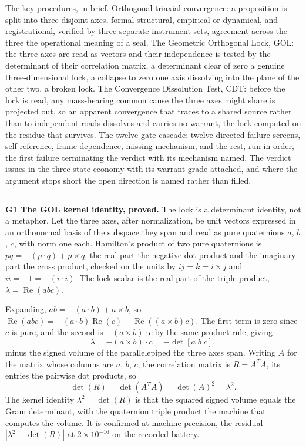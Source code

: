 \documentclass[10pt,twocolumn]{article}
\newenvironment{jbox}{\par\vspace{2pt}\noindent\color{accent}\rule{\columnwidth}{0.8pt}\par\vspace{-2pt}\small}{\par\vspace{2pt}}
\begin{document}
The key procedures, in brief. Orthogonal triaxial convergence: a
proposition is split into three disjoint axes, formal-structural,
empirical or dynamical, and registrational, verified by three separate
instrument sets, agreement across the three the operational meaning of a
seal. The Geometric Orthogonal Lock, GOL: the three axes are read as
vectors and their independence is tested by the determinant of their
correlation matrix, a determinant clear of zero a genuine
three-dimensional lock, a collapse to zero one axis dissolving into the
plane of the other two, a broken lock. The Convergence Dissolution Test,
CDT: before the lock is read, any mass-bearing common cause the three
axes might share is projected out, so an apparent convergence that
traces to a shared source rather than to independent roads dissolves and
carries no warrant, the lock computed on the residue that survives. The
twelve-gate cascade: twelve directed failure screens, self-reference,
frame-dependence, missing mechanism, and the rest, run in order, the
first failure terminating the verdict with its mechanism named. The
verdict issues in the three-state economy with its warrant grade
attached, and where the argument stops short the open direction is named
rather than filled.

\begin{jbox}
\color{black}
\textbf{G1 The GOL kernel identity, proved.} The lock is a determinant identity, not a metaphor. Let the three axes, after normalization, be unit vectors expressed in an orthonormal basis of the subspace they span and read as pure quaternions $a$, $b$, $c$, with norm one each. Hamilton's product of two pure quaternions is $pq=-(p\cdot q)+p\times q$, the real part the negative dot product and the imaginary part the cross product, checked on the units by $ij=k=i\times j$ and $ii=-1=-(i\cdot i)$. The lock scalar is the real part of the triple product, $\lambda=\operatorname{Re}(abc)$.

Expanding, $ab=-(a\cdot b)+a\times b$, so $\operatorname{Re}(abc)=-(a\cdot b)\operatorname{Re}(c)+\operatorname{Re}((a\times b)c)$. The first term is zero since $c$ is pure, and the second is $-(a\times b)\cdot c$ by the same product rule, giving
\[\lambda=-(a\times b)\cdot c=-\det[a\;b\;c],\]
minus the signed volume of the parallelepiped the three axes span. Writing $A$ for the matrix whose columns are $a$, $b$, $c$, the correlation matrix is $R=A^{T}A$, its entries the pairwise dot products, so
\[\det(R)=\det(A^{T}A)=\det(A)^2=\lambda^2.\]
The kernel identity $\lambda^2=\det(R)$ is that the squared signed volume equals the Gram determinant, with the quaternion triple product the machine that computes the volume. It is confirmed at machine precision, the residual $|\lambda^2-\det(R)|$ at $2\times10^{-16}$ on the recorded battery.
\end{jbox}
\end{document}
